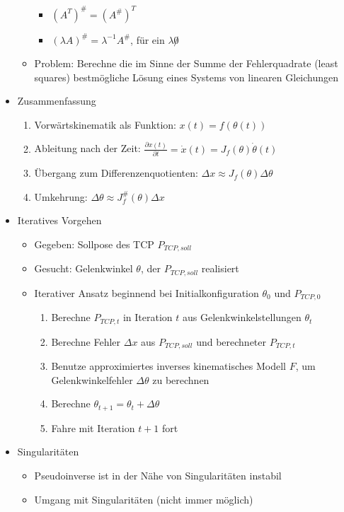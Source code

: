 \documentclass[paper=a4, fontsize=11pt]{scrartcl} %
\numberwithin{equation}{section} %
\numberwithin{figure}{section} %
\numberwithin{table}{section} %
\begin{document}
\begin{itemize}
\begin{itemize}
\begin{itemize}
\item $(A^T)^\# = (A^\#)^T$
\item $(\lambda A)^\# = \lambda^{-1} A^\#$, für ein $\lambda \not 0$
\end{itemize}
\item Problem: Berechne die im Sinne der Summe der Fehlerquadrate (least squares) bestmögliche Lösung eines Systems von linearen Gleichungen
\end{itemize}
\item Zusammenfassung
\begin{enumerate}
\item Vorwärtskinematik als Funktion: $x(t) = f(\theta(t))$
\item Ableitung nach der Zeit: $\frac{\partial x(t)}{\partial t} = \dot x(t) = J_f(\theta) \dot \theta(t)$
\item Übergang zum Differenzenquotienten: $\Delta x \approx J_f(\theta) \Delta \theta$
\item Umkehrung: $\Delta \theta \approx J_f^\#(\theta)\Delta x$
\end{enumerate}
\item Iteratives Vorgehen
\begin{itemize}
\item Gegeben: Sollpose des TCP $P_{TCP,soll}$
\item Gesucht: Gelenkwinkel $\theta$, der $P_{TCP,soll}$ realisiert
\item Iterativer Ansatz beginnend bei Initialkonfiguration $\theta_0$ und $P_{TCP,0}$
\begin{enumerate}
\item Berechne $P_{TCP,t}$ in Iteration $t$ aus Gelenkwinkelstellungen $\theta_t$
\item Berechne Fehler $\Delta x$ aus $P_{TCP,soll}$ und berechneter $P_{TCP,t}$
\item Benutze approximiertes inverses kinematisches Modell $F$, um Gelenkwinkelfehler $\Delta \theta$ zu berechnen
\item Berechne $\theta_{t+1} = \theta_t + \Delta \theta$
\item Fahre mit Iteration $t+1$ fort
\end{enumerate}
\end{itemize}
\item Singularitäten
\begin{itemize}
\item Pseudoinverse ist in der Nähe von Singularitäten instabil
\item Umgang mit Singularitäten (nicht immer möglich)

\end{itemize}
\end{itemize}
\end{document}
